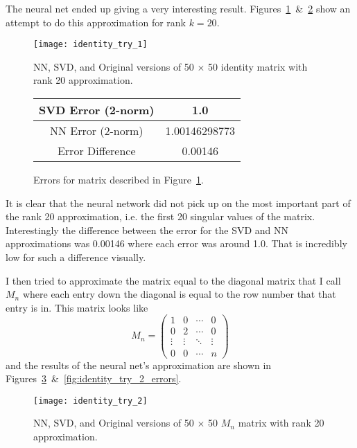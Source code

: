 \documentclass[a4paper,twoside]{article}
\begin{document}
\indent The neural net ended up giving a very interesting result. Figures~\ref{fig:identity_try_1}~\&~\ref{fig:identity_try_1_errors} show an attempt to do this approximation for rank $k = 20$.

\begin{figure}[H]
\centering
\texttt{[image: identity\_try\_1]}
\caption{NN, SVD, and Original versions of 50 $\times$ 50 identity matrix with rank 20 approximation.}
\label{fig:identity_try_1}
\end{figure}

\begin{figure}[H]
\centering
\begin{tabular}{|c|c|}
    \hline
    SVD Error (2-norm) & 1.0\\
    \hline
    NN Error (2-norm) & 1.00146298773\\
    \hline
    Error Difference & 0.00146\\
    \hline
\end{tabular}
\caption{Errors for matrix described in Figure~\ref{fig:identity_try_1}.}
\label{fig:identity_try_1_errors}
\end{figure}

\indent It is clear that the neural network did not pick up on the most important part of the rank 20 approximation, i.e. the first 20 singular values of the matrix. Interestingly the difference between the error for the SVD and NN approximations was 0.00146 where each error was around 1.0. That is incredibly low for such a difference visually.

\indent I then tried to approximate the matrix equal to the diagonal matrix that I call $M_n$ where each entry down the diagonal is equal to the row number that that entry is in. This matrix looks like $$M_n = \begin{pmatrix}1&0&\cdots&0\\0&2&\cdots&0\\\vdots&\vdots&\ddots&\vdots\\0&0&\cdots&n\end{pmatrix}$$ and the results of the neural net's approximation are shown in Figures~\ref{fig:identity_try_2}~\&~\ref{fig:identity_try_2_errors}.

\begin{figure}[H]
\centering
\texttt{[image: identity\_try\_2]}
\caption{NN, SVD, and Original versions of 50 $\times$ 50 $M_n$ matrix with rank 20 approximation.}
\label{fig:identity_try_2}
\end{figure}
\end{document}
